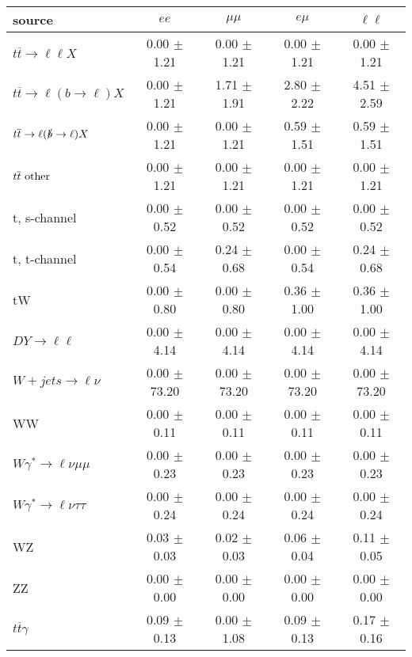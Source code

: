 \begin{tabular}{l|cccc} \hline\hline
source & $ee$ & $\mu\mu$ & $e\mu$ & $\ell\ell $ \\
\hline
$t\overline{t} \rightarrow \ell \ell X$ &  0.00 $\pm$  1.21 &  0.00 $\pm$  1.21 &  0.00 $\pm$  1.21 &  0.00 $\pm$  1.21 \\
$t\overline{t} \rightarrow \ell (b \rightarrow \ell) X$ &  0.00 $\pm$  1.21 &  1.71 $\pm$  1.91 &  2.80 $\pm$  2.22 &  4.51 $\pm$  2.59 \\
$t\overline{t} \rightarrow \ell (\slashed b \rightarrow \ell) X$ &  0.00 $\pm$  1.21 &  0.00 $\pm$  1.21 &  0.59 $\pm$  1.51 &  0.59 $\pm$  1.51 \\
        $t\overline{t}\ \rm{other}$ &  0.00 $\pm$  1.21 &  0.00 $\pm$  1.21 &  0.00 $\pm$  1.21 &  0.00 $\pm$  1.21 \\
\hline
                       t, s-channel &  0.00 $\pm$  0.52 &  0.00 $\pm$  0.52 &  0.00 $\pm$  0.52 &  0.00 $\pm$  0.52 \\
                       t, t-channel &  0.00 $\pm$  0.54 &  0.24 $\pm$  0.68 &  0.00 $\pm$  0.54 &  0.24 $\pm$  0.68 \\
                                 tW &  0.00 $\pm$  0.80 &  0.00 $\pm$  0.80 &  0.36 $\pm$  1.00 &  0.36 $\pm$  1.00 \\
\hline
         $DY \rightarrow \ell \ell$ &  0.00 $\pm$  4.14 &  0.00 $\pm$  4.14 &  0.00 $\pm$  4.14 &  0.00 $\pm$  4.14 \\
      $W+jets \rightarrow \ell \nu$ &  0.00 $\pm$ 73.20 &  0.00 $\pm$ 73.20 &  0.00 $\pm$ 73.20 &  0.00 $\pm$ 73.20 \\
                                 WW &  0.00 $\pm$  0.11 &  0.00 $\pm$  0.11 &  0.00 $\pm$  0.11 &  0.00 $\pm$  0.11 \\
\hline
$W\gamma^{*} \rightarrow \ell \nu \mu\mu$ &  0.00 $\pm$  0.23 &  0.00 $\pm$  0.23 &  0.00 $\pm$  0.23 &  0.00 $\pm$  0.23 \\
$W\gamma^{*} \rightarrow \ell \nu \tau\tau$ &  0.00 $\pm$  0.24 &  0.00 $\pm$  0.24 &  0.00 $\pm$  0.24 &  0.00 $\pm$  0.24 \\
                                 WZ &  0.03 $\pm$  0.03 &  0.02 $\pm$  0.03 &  0.06 $\pm$  0.04 &  0.11 $\pm$  0.05 \\
                                 ZZ &  0.00 $\pm$  0.00 &  0.00 $\pm$  0.00 &  0.00 $\pm$  0.00 &  0.00 $\pm$  0.00 \\
\hline
              $t\overline{t}\gamma$ &  0.09 $\pm$  0.13 &  0.00 $\pm$  1.08 &  0.09 $\pm$  0.13 &  0.17 $\pm$  0.16 \\

\end{tabular}
